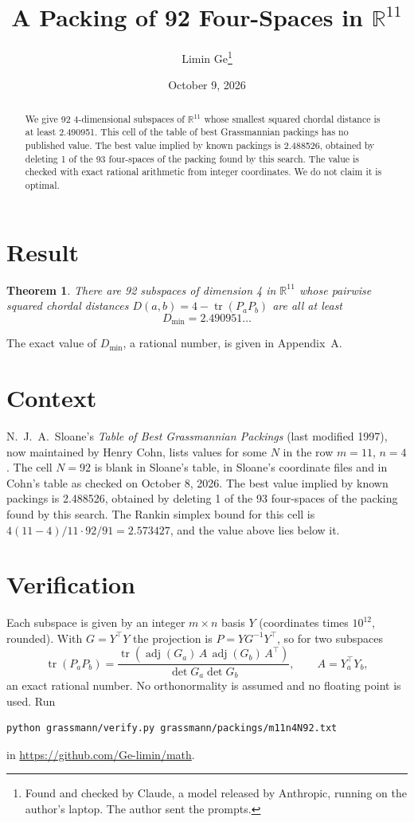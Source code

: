 \documentclass[11pt,a4paper]{article}
\title{A Packing of 92 Four-Spaces in $\mathbb{R}^{11}$}
\author{Limin Ge\thanks{Found and checked by Claude, a model released by Anthropic, running on the author's laptop. The author sent the prompts.}}
\date{October 9, 2026}
\newtheorem*{theorem}{Theorem}
\begin{document}
\maketitle
\begin{abstract}
We give 92 4-dimensional subspaces of $\mathbb{R}^{11}$ whose smallest squared chordal distance is at least 2.490951. This cell of the table of best Grassmannian packings has no published value. The best value implied by known packings is 2.488526, obtained by deleting 1 of the 93 four-spaces of the packing found by this search. The value is checked with exact rational arithmetic from integer coordinates. We do not claim it is optimal.
\end{abstract}

\section{Result}
\begin{theorem}
There are 92 subspaces of dimension 4 in $\mathbb{R}^{11}$ whose pairwise squared chordal distances $D(a,b) = 4 - \operatorname{tr}(P_aP_b)$ are all at least
\[ D_{\min} = 2.490951\ldots \]
\end{theorem}
The exact value of $D_{\min}$, a rational number, is given in Appendix~A.


\section{Context}
N.~J.~A.~Sloane's \emph{Table of Best Grassmannian Packings} (last modified 1997), now maintained by Henry Cohn, lists values for some $N$ in the row $m=11$, $n=4$. The cell $N=92$ is blank in Sloane's table, in Sloane's coordinate files and in Cohn's table as checked on October 8, 2026. The best value implied by known packings is 2.488526, obtained by deleting 1 of the 93 four-spaces of the packing found by this search. The Rankin simplex bound for this cell is $4(11-4)/11\cdot 92/91 = 2.573427$, and the value above lies below it.


\section{Verification}
Each subspace is given by an integer $m\times n$ basis $Y$ (coordinates times $10^{12}$, rounded). With $G=Y^\top Y$ the projection is $P=YG^{-1}Y^\top$, so for two subspaces
\[ \operatorname{tr}(P_aP_b)=\frac{\operatorname{tr}(\operatorname{adj}(G_a)\,A\,\operatorname{adj}(G_b)\,A^\top)}{\det G_a\det G_b},\qquad A=Y_a^\top Y_b, \]
an exact rational number. No orthonormality is assumed and no floating point is used. Run
\begin{verbatim}
python grassmann/verify.py grassmann/packings/m11n4N92.txt
\end{verbatim}
in \url{https://github.com/Ge-limin/math}.
\end{document}
